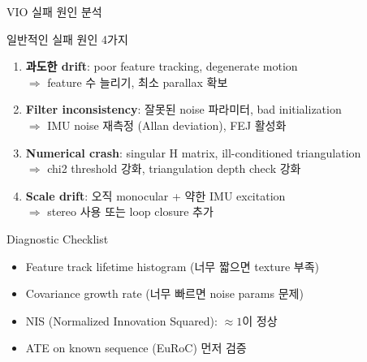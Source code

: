 \begin{frame}[shrink=10]{VIO 실패 원인 분석}
  \begin{block}{일반적인 실패 원인 4가지}
    \begin{enumerate}
      \item \textbf{과도한 drift}: poor feature tracking, degenerate motion\\
        $\Rightarrow$ feature 수 늘리기, 최소 parallax 확보
      \item \textbf{Filter inconsistency}: 잘못된 noise 파라미터, bad initialization\\
        $\Rightarrow$ IMU noise 재측정 (Allan deviation), FEJ 활성화
      \item \textbf{Numerical crash}: singular H matrix, ill-conditioned triangulation\\
        $\Rightarrow$ chi2 threshold 강화, triangulation depth check 강화
      \item \textbf{Scale drift}: 오직 monocular + 약한 IMU excitation\\
        $\Rightarrow$ stereo 사용 또는 loop closure 추가
    \end{enumerate}
  \end{block}
  \begin{exampleblock}{Diagnostic Checklist}
    \begin{itemize}
      \item Feature track lifetime histogram (너무 짧으면 texture 부족)
      \item Covariance growth rate (너무 빠르면 noise params 문제)
      \item NIS (Normalized Innovation Squared): $\approx 1$이 정상
      \item ATE on known sequence (EuRoC) 먼저 검증
    \end{itemize}
  \end{exampleblock}
\end{frame}



